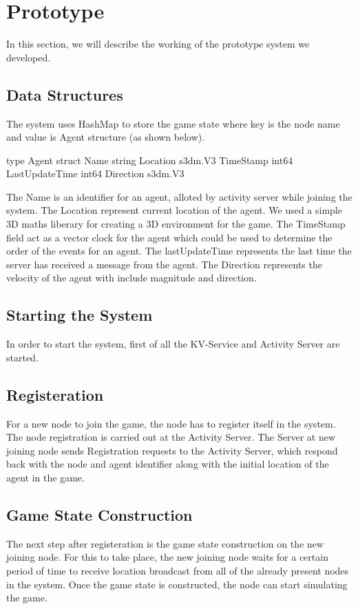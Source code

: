 \section{Prototype}
\label{sec:prototype}
	In this section, we will describe the working of the prototype system we developed.
\subsection{Data Structures}
	The system uses HashMap to store the game state where key is the node name and value is Agent structure (as shown below).

	type Agent struct {
		Name string 
		Location s3dm.V3 
		TimeStamp int64 
		LastUpdateTime int64 
		Direction s3dm.V3 
	}

	The Name is an identifier for an agent, alloted by activity server while joining the system. The Location represent current location of the agent. We used a simple 3D maths liberary for creating a 3D environment for the game. The TimeStamp field act as a vector clock for the agent which could be used to determine the order of the events for an agent.
	The lastUpdateTime represents the last time the server has received a message from the agent. The Direction represents the velocity of the agent with include magnitude and direction.

\subsection{Starting the System}
	In order to start the system, first of all the KV-Service and Activity Server are started.
	
\subsection{Registeration}
	For a  new node to join the game, the node has to register itself in the system. The node registration is carried out at the Activity Server. The Server at new joining node sends Registration requests to the Activity Server, which respond back with the node and agent identifier along with the initial location of the agent in the game.

\subsection{Game State Construction}
	The next step after registeration is the game state construction on the new joining node. For this to take place, the new joining node waits for a certain period of time to receive location broadcast from all of the already present nodes in the system. Once the game state is constructed, the node can start simulating the game.	
